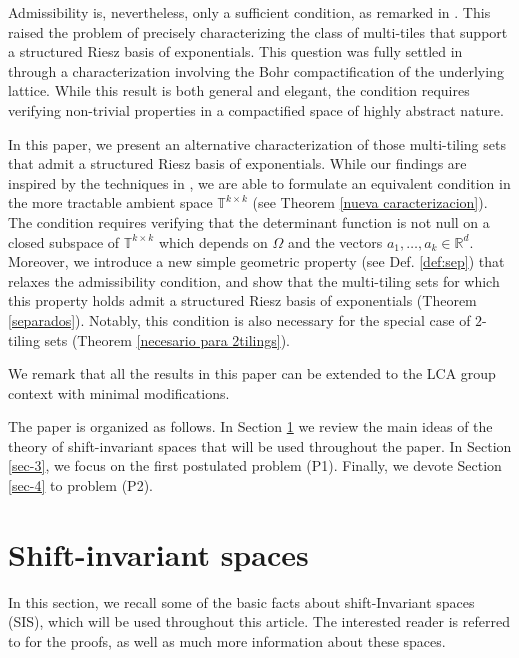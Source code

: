 \documentclass[a4paper,11pt]{amsart}
\theoremstyle{definition}
\theoremstyle{definition}
\def\R{\mathbb{R}}
\def\T{\mathbb{T}}
\begin{document}
	Admissibility is, nevertheless, only a sufficient condition, as remarked in \cite{CC}. This raised the problem of precisely characterizing the class of multi-tiles that support a structured Riesz basis of exponentials. This question was fully settled in \cite{CUC} through a characterization involving the Bohr compactification of the underlying lattice. While this result is both general and elegant, the condition requires verifying non-trivial properties in a compactified space of highly abstract nature. 
	
	In this paper, we present an alternative characterization of those multi-tiling sets that admit a structured Riesz basis of exponentials. While our findings are inspired by the techniques in \cite{CUC}, we are able to formulate an equivalent condition in the more tractable ambient space $\T^{k\times k}$ (see Theorem \ref{nueva caracterizacion}). The condition requires verifying that the determinant function is not null on a closed subspace of $\T^{k\times k}$ which depends on $\Omega$ and the vectors $a_1,\dots,a_k\in\R^d$. Moreover, we introduce a new simple geometric property (see Def. \ref{def:sep}) that relaxes the admissibility condition, and show that the multi-tiling sets for which this property holds admit a structured Riesz basis of exponentials (Theorem \ref{separados}). Notably, this condition is also necessary for the special case of $2$-tiling sets (Theorem \ref{necesario para 2tilings}).
	
	\medskip
	
	\noindent We remark that all the results in this paper can be extended to the LCA group context with minimal  modifications.
	
	\medskip
	
	\noindent The paper is organized as follows. In Section \ref{sec-2} we review the main ideas of the theory of shift-invariant spaces that will be used throughout the paper. In Section \ref{sec-3}, we focus on the first postulated problem (P1). Finally, we devote Section \ref{sec-4} to problem (P2).
	
	
	\section{Shift-invariant spaces}\label{sec-2}
	
	In this section, we recall some of the basic facts about shift-Invariant spaces (SIS), which will be used throughout this article. The interested reader is referred to \cite{B, BDR2,CP, Chr2003} for the proofs, as well as much more information about these spaces. 
	
\end{document}
